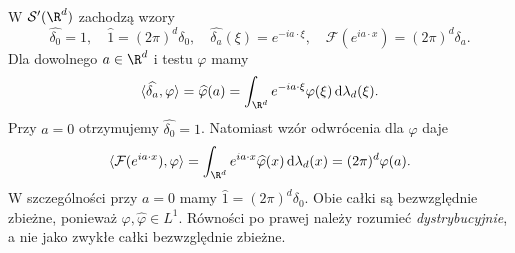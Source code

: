 \begin{przyklad}
\label{ex:pde8-four}
W $\mathcal S'(\R^d)$ zachodzą wzory
\[
 \widehat{\delta_0}=1,\quad
 \widehat 1=(2\pi)^d\delta_0,\quad
 \widehat{\delta_a}(\xi)=e^{-ia\cdot\xi},\quad
 \mathcal F(e^{ia\cdot x})=(2\pi)^d\delta_a.
\]
Dla dowolnego $a\in\R^d$ i testu $\varphi$ mamy
\[
 \langle\widehat{\delta_a},\varphi\rangle
 =\widehat\varphi(a)
 =\int_{\R^d}e^{-ia\cdot\xi}\varphi(\xi)
 \,\mathrm d\lambda_d(\xi).
\]
Przy $a=0$ otrzymujemy $\widehat{\delta_0}=1$.
Natomiast wzór odwrócenia dla $\varphi$ daje
\[
 \langle\mathcal F(e^{ia\cdot x}),\varphi\rangle
 =\int_{\R^d}e^{ia\cdot x}\widehat\varphi(x)
 \,\mathrm d\lambda_d(x)
 =(2\pi)^d\varphi(a).
\]
W szczególności przy $a=0$ mamy
$\widehat1=(2\pi)^d\delta_0$. Obie całki
są bezwzględnie zbieżne, ponieważ
$\varphi,\widehat\varphi\in L^1$.
Równości po prawej należy rozumieć \emph{dystrybucyjnie},
a nie jako zwykłe całki bezwzględnie zbieżne.
\end{przyklad}

